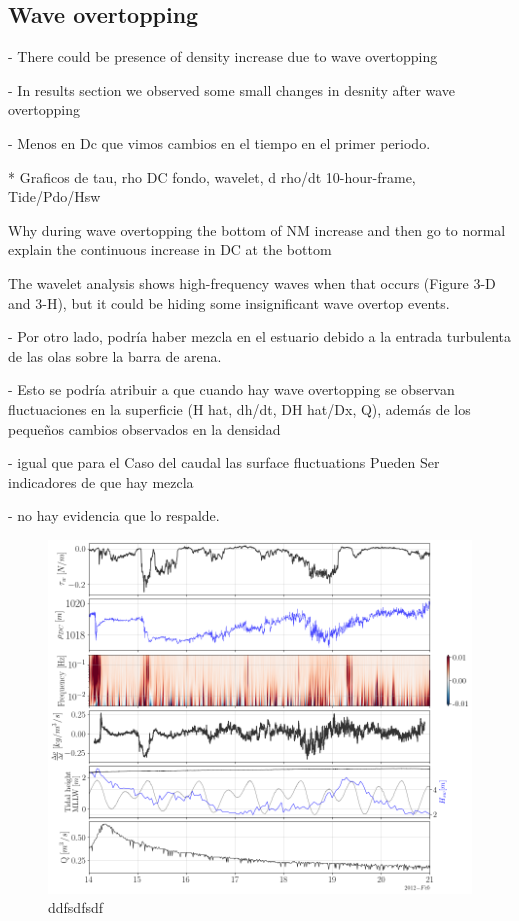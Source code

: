 \documentclass[tesis.tex]{subfiles}
\begin{document}
\subsection{Wave overtopping}

- There could be presence of density increase due to wave overtopping 

- In results section we observed some small changes in desnity after wave overtopping 

- Menos en Dc que vimos cambios en el tiempo en el primer periodo.

* Graficos de tau, rho DC fondo, wavelet, d rho/dt 10-hour-frame, Tide/Pdo/Hsw

Why during wave overtopping the bottom of NM increase and then go to normal
explain the  continuous increase in DC at the bottom

The wavelet analysis shows high-frequency waves when that occurs (Figure 3-D and 3-H), but it could be hiding some insignificant wave overtop events.

- Por otro lado, podría haber mezcla en el estuario debido a la entrada turbulenta de las olas sobre la barra de arena.

- Esto se podría atribuir a que cuando hay wave overtopping se observan fluctuaciones en la superficie (H hat, dh/dt, DH hat/Dx, Q), además de los pequeños cambios observados en la densidad

- igual que para el Caso del caudal las surface fluctuations Pueden Ser indicadores de que hay mezcla

- no hay evidencia que lo respalde.

\begin{figure}[h!]
    \centering
    \includegraphics[width=\textwidth]{Imagenes/mix_wo.png}
    \caption{ddfsdfsdf }
    \label{fig:mix_wo}
\end{figure}
\end{document}
